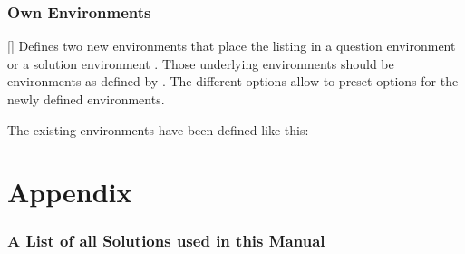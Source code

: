 \documentclass[load-preamble+]{cnltx-doc}
\begin{document}
\section{Own Environments}

\begin{commands}
  []
    Defines two new  environments that place the listing in a
    question environment  or a solution environment
    .  Those underlying environments should be
    environments as defined by .  The different options
    allow to preset options for the newly defined environments.
\end{commands}

The existing environments have been defined like this:
\begin{sourcecode}
\end{sourcecode}

\appendix
\part{Appendix}
\section{A List of all Solutions used in this Manual}\label{sec:solutions:list}
\printsolutions
\end{document}
